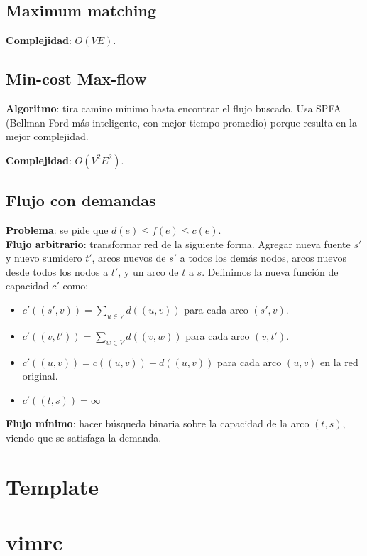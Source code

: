 {\subsection{Maximum matching}
\textbf{Complejidad}: $O(VE)$.

\subsection{Min-cost Max-flow}
\textbf{Algoritmo}: tira camino mínimo hasta encontrar el flujo buscado. Usa SPFA (Bellman-Ford más inteligente, con mejor
tiempo promedio) porque resulta en la mejor complejidad.

\textbf{Complejidad}: $O(V^2E^2)$.

\subsection{Flujo con demandas}
\textbf{Problema}: se pide que $d(e) \leq f(e) \leq c(e)$. \\
\textbf{Flujo arbitrario}: transformar red de la siguiente forma. Agregar nueva fuente $s'$ y nuevo sumidero $t'$,
arcos nuevos de $s'$ a todos los demás nodos, arcos nuevos desde todos los nodos a $t'$, y un arco de $t$ a $s$.
Definimos la nueva función de capacidad $c'$ como:
\begin{itemize}
\item $c'((s',v)) = \sum\nolimits_{u \in V} d((u,v))$ para cada arco $(s',v)$.
\item $c'((v,t')) = \sum\nolimits_{w \in V} d((v,w))$ para cada arco $(v,t')$.
\item $c'((u,v)) = c((u,v)) - d((u,v))$ para cada arco $(u,v)$ en la red original.
\item $c'((t,s)) = \infty$
\end{itemize}
\textbf{Flujo mínimo}: hacer búsqueda binaria sobre la capacidad de la arco $(t, s)$, viendo que se satisfaga la demanda.

\section{Template}%

\section{vimrc}

}
